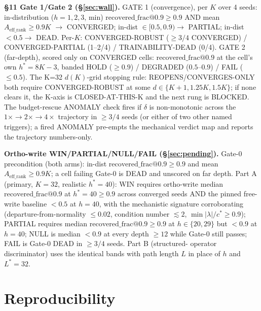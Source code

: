 \documentclass{article} %
\begin{document}
\textbf{\S11 Gate 1/Gate 2 (\S\ref{sec:wall}).} GATE 1 (convergence), per
$K$ over 4 seeds: in-distribution ($h{=}1,2,3$, min) $\mathrm{recovered\_frac@0.9}
\geq 0.9$ AND mean $A_{\mathrm{eff\_rank}} \geq 0.9K$
$\to$ CONVERGED; in-dist $\in [0.5,0.9) \to$ PARTIAL; in-dist $< 0.5
\to$ DEAD. Per-$K$: CONVERGED-ROBUST ($\geq 3/4$ CONVERGED) /
CONVERGED-PARTIAL (1--2/4) / TRAINABILITY-DEAD (0/4). GATE 2 (far-depth),
scored only on CONVERGED cells: $\mathrm{recovered\_frac@0.9}$ at the
cell's own $h^\ast = 8K{-}3$, banded HOLD ($\geq 0.9$) / DEGRADED
($0.5$--$0.9$) / FAIL ($\leq 0.5$).
The K=32 $d(K)$-grid stopping rule: REOPENS/CONVERGES-ONLY both require
CONVERGED-ROBUST at some $d \in \{K{+}1, 1.25K, 1.5K\}$; if none clears
it, the K-axis is CLOSED-AT-THIS-K and the next rung is BLOCKED.
The budget-rescue ANOMALY check fires if $\delta$ is non-monotonic across
the $1\times{\to}2\times{\to}4\times$ trajectory in $\geq 3/4$ seeds (or
either of two other named triggers); a fired ANOMALY pre-empts the
mechanical verdict map and reports the trajectory numbers-only.

\textbf{Ortho-write WIN/PARTIAL/NULL/FAIL (\S\ref{sec:pending}).} Gate-0
precondition (both arms): in-dist $\mathrm{recovered\_frac@0.9} \geq 0.9$
and mean $A_{\mathrm{eff\_rank}} \geq 0.9K$; a cell failing Gate-0 is DEAD
and unscored on far depth. Part A (primary, $K{=}32$, realistic $h^\ast=40$):
WIN requires ortho-write median $\mathrm{recovered\_frac@0.9}$ at
$h^\ast{=}40 \geq 0.9$ across converged seeds AND the pinned free-write
baseline $< 0.5$ at $h{=}40$, with the mechanistic signature corroborating
(departure-from-normality $\leq 0.02$, condition number $\lesssim 2$,
$\min|\lambda|/c^\ast \geq 0.9$); PARTIAL requires median
$\mathrm{recovered\_frac@0.9} \geq 0.9$ at $h \in \{20, 29\}$ but $< 0.9$
at $h{=}40$; NULL is median $< 0.9$ at every depth $\geq 12$ while Gate-0
still passes; FAIL is Gate-0 DEAD in $\geq 3/4$ seeds. Part B (structured-
operator discriminator) uses the identical bands with path length $L$ in
place of $h$ and $L^\ast{=}32$.

\section{Reproducibility}
\label{app:repro}
\end{document}
